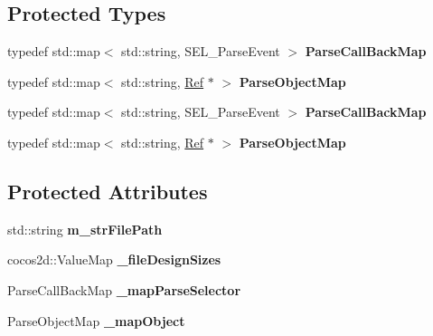 \subsection*{Protected Types}
\begin{DoxyCompactItemize}
\item 
\mbox{\label{classcocostudio_1_1GUIReader_aca358932adfec948ff1e7aac763e66f2}} 
typedef std\+::map$<$ std\+::string, S\+E\+L\+\_\+\+Parse\+Event $>$ {\bfseries Parse\+Call\+Back\+Map}
\item 
\mbox{\label{classcocostudio_1_1GUIReader_a0cc3f583fe9e00559aa7dcb701977b24}} 
typedef std\+::map$<$ std\+::string, \hyperlink{classRef}{Ref} $\ast$ $>$ {\bfseries Parse\+Object\+Map}
\item 
\mbox{\label{classcocostudio_1_1GUIReader_aca358932adfec948ff1e7aac763e66f2}} 
typedef std\+::map$<$ std\+::string, S\+E\+L\+\_\+\+Parse\+Event $>$ {\bfseries Parse\+Call\+Back\+Map}
\item 
\mbox{\label{classcocostudio_1_1GUIReader_a0cc3f583fe9e00559aa7dcb701977b24}} 
typedef std\+::map$<$ std\+::string, \hyperlink{classRef}{Ref} $\ast$ $>$ {\bfseries Parse\+Object\+Map}
\end{DoxyCompactItemize}
\subsection*{Protected Attributes}
\begin{DoxyCompactItemize}
\item 
\mbox{\label{classcocostudio_1_1GUIReader_ab5d739bf7fb0182f83ab92751310c560}} 
std\+::string {\bfseries m\+\_\+str\+File\+Path}
\item 
\mbox{\label{classcocostudio_1_1GUIReader_a03c8c86a3603b66e22550141944171b0}} 
cocos2d\+::\+Value\+Map {\bfseries \+\_\+file\+Design\+Sizes}
\item 
\mbox{\label{classcocostudio_1_1GUIReader_a091fc7a52194ce14f2abba5df9cef276}} 
Parse\+Call\+Back\+Map {\bfseries \+\_\+map\+Parse\+Selector}
\item 
\mbox{\label{classcocostudio_1_1GUIReader_a848cf010bf3011e177640c0cf3d728aa}} 
Parse\+Object\+Map {\bfseries \+\_\+map\+Object}
\end{DoxyCompactItemize}


